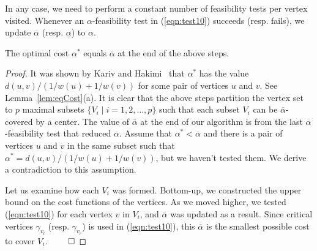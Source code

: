 \documentclass{llncs}
\newcommand{\QED}{\hfill$\qed$}
\begin{document}
{In any case, we need to perform a constant number of feasibility tests per vertex visited.
Whenever an $\alpha$-feasibility test in (\ref{eqn:test10})
succeeds (resp. fails),
we update $\overline{\alpha}$ (resp. $\underline{\alpha}$) to $\alpha$.
\begin{lemma} \label{lem:finalAlpha}
The optimal cost $\alpha^*$ equals $\overline{\alpha}$ at the end of the above steps.
\end{lemma}
\begin{proof}
It was shown by Kariv and Hakimi~\cite{kariv1979b} that $\alpha^*$ has the value
$d(u,v)/(1/w(u)+1/w(v))$ for some pair of vertices $u$ and $v$.
See Lemma~\ref{lem:eqCost}(a). 
It is clear that the above steps partition the vertex set to $p$ maximal subsets
$\{V_i\mid i=1,2,\ldots, p\}$
such that each subset $V_i$ can be $\overline{\alpha}$-covered by a center.
The value of $\overline{\alpha}$ at the end of our algorithm is
from the last ${\alpha}$-feasibility test that reduced $\overline{\alpha}$.
Assume that $\alpha^*< \overline{\alpha}$ and there is a pair of
vertices $u$ and $v$ in the same subset such that  $\alpha^*= d(u,v)/(1/w(u)+1/w(v))$,
but we haven't tested them. 
We derive a contradiction to this assumption.

Let us examine how each $V_i$ was formed.
Bottom-up, we constructed the upper bound on the cost functions of the vertices.
As we moved higher, we tested (\ref{eqn:test10}) for each vertex $v$ in $V_i$,
and $\overline{\alpha}$ was updated as a result.
Since critical vertices $\gamma_{v_l}$ (resp. $\gamma_{v_r}$) is used in
(\ref{eqn:test10}), this $\overline{\alpha}$ is the smallest possible cost to cover $V_i$.
 \QED
\end{proof}




}
\end{document}
